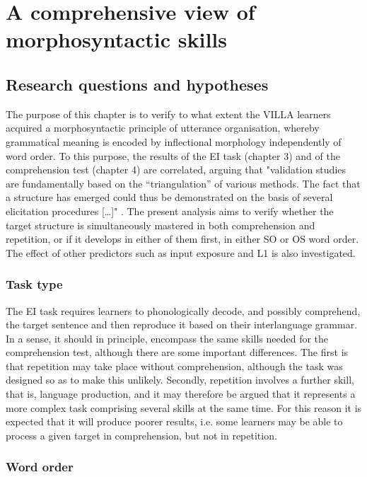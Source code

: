 \chapter{A comprehensive view of morphosyntactic skills}

\section{Research questions and hypotheses}\label{sec:06:1}

The purpose of this chapter is to verify to what extent the VILLA learners acquired a morphosyntactic principle of utterance organisation, whereby grammatical meaning is encoded by inflectional morphology independently of word order. To this purpose, the results of the EI task (chapter 3) and of the comprehension test (chapter 4) are correlated, arguing that "validation studies are fundamentally based on the “triangulation” of various methods. The fact that a structure has emerged could thus be demonstrated on the basis of several elicitation procedures […]" \citep[326]{Pallotti2006}. The present analysis aims to verify whether the target structure is simultaneously mastered in both comprehension and repetition, or if it develops in either of them first, in either SO or OS word order. The effect of other predictors such as input exposure and L1 is also investigated.

\subsection{Task type}\label{sec:06:1.1}

The EI task requires learners to phonologically decode, and possibly comprehend, the target sentence and then reproduce it based on their interlanguage grammar. In a sense, it should in principle, encompass the same skills needed for the comprehension test, although there are some important differences. The first is that repetition may take place without comprehension, although the task was designed so as to make this unlikely. Secondly, repetition involves a further skill, that is, language production, and it may therefore be argued that it represents a more complex task comprising several skills at the same time. For this reason it is expected that it will produce poorer results, i.e. some learners may be able to process a given target in comprehension, but not in repetition.

\subsection{Word order}\label{sec:06:1.2}

